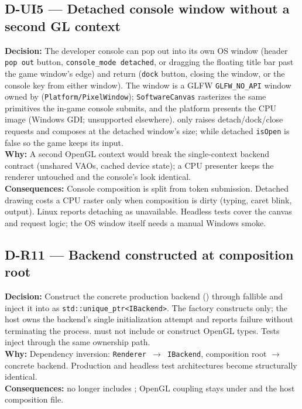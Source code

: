 \subsection*{D-UI5 --- Detached console window without a second GL context}
\begin{decisionbox}[title={D-UI5 \quad 2026-09-23}]
\textbf{Decision:} The developer console can pop out into its own OS window
(header \texttt{pop out} button, \texttt{console\_mode detached}, or dragging
the floating title bar past the game window's edge) and return (\texttt{dock}
button, closing the window, or the console key from either window). The
window is
a GLFW \texttt{GLFW\_NO\_API} window owned by 
(\texttt{Platform/PixelWindow}); \texttt{SoftwareCanvas} rasterizes the same
 primitives the in-game console submits, and the
platform presents the CPU image (Windows GDI; unsupported elsewhere).
 only raises detach/dock/close requests and composes
at the detached window's size; while detached \texttt{isOpen} is false so the
game keeps its input.\\
\textbf{Why:} A second OpenGL context would break the single-context backend
contract (unshared VAOs, cached device state); a CPU presenter keeps the
renderer untouched and the console's look identical.\\
\textbf{Consequences:} Console composition is split from token submission.
Detached drawing costs a CPU raster only when composition is dirty (typing,
caret blink, output). Linux reports detaching as unavailable. Headless tests
cover the canvas and request logic; the OS window itself needs a manual
Windows smoke.
\end{decisionbox}

\subsection*{D-R11 --- Backend constructed at composition root}
\begin{decisionbox}[title={D-R11 \quad 2026-08-06}]
\textbf{Decision:} Construct the concrete production backend
() through fallible  and
inject it into  as \texttt{std::unique\_ptr<IBackend>}.
The factory constructs only; the host owns the backend's single initialization
attempt and reports failure without terminating the process. 
must not include or construct OpenGL types. Tests inject
 through the same ownership path.\\
\textbf{Why:} Dependency inversion: \texttt{Renderer $\rightarrow$ IBackend},
composition root $\rightarrow$ concrete backend. Production and headless test
architectures become structurally identical.\\
\textbf{Consequences:}  no longer includes
; OpenGL coupling stays under
 and the host composition file.
\end{decisionbox}

